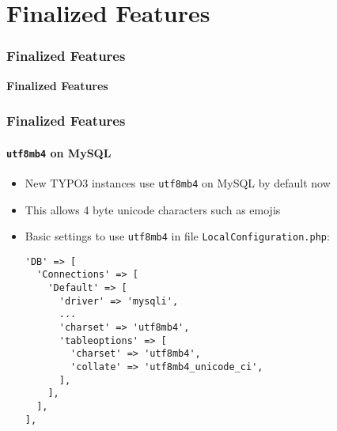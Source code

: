 %

\section{Finalized Features}
\begin{frame}[fragile]
	\frametitle{Finalized Features}
	\begin{center}\huge{\color{typo3darkgrey}\textbf{Finalized Features}}\end{center}
\end{frame}


\begin{frame}[fragile]
	\frametitle{Finalized Features}
	\framesubtitle{\texttt{utf8mb4} on MySQL}

	\lstset{basicstyle=\tiny\ttfamily}

	\begin{itemize}
		\item New TYPO3 instances use \texttt{utf8mb4} on MySQL by default now
		\item This allows 4 byte unicode characters such as emojis
		\item Basic settings to use \texttt{utf8mb4} in file \texttt{LocalConfiguration.php}:

\begin{lstlisting}
'DB' => [
  'Connections' => [
    'Default' => [
      'driver' => 'mysqli',
      ...
      'charset' => 'utf8mb4',
      'tableoptions' => [
        'charset' => 'utf8mb4',
        'collate' => 'utf8mb4_unicode_ci',
      ],
    ],
  ],
],
\end{lstlisting}

	\end{itemize}

\end{frame}


